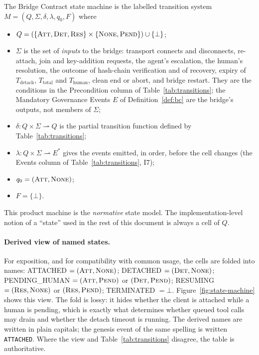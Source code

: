 \begin{definition}\label{def:sm}
The Bridge Contract state machine is the labelled transition system
$M = (Q, \Sigma, \delta, \lambda, q_0, F)$ where
\begin{itemize}[leftmargin=2em]
\item $Q = (\{\textsc{Att}, \textsc{Det}, \textsc{Res}\} \times
\{\textsc{None}, \textsc{Pend}\}) \cup \{\bot\}$;
\item $\Sigma$ is the set of \emph{inputs} to the bridge: transport
connects and disconnects, re-attach, join and key-addition requests, the
agent's escalation, the human's resolution, the outcome of hash-chain
verification and of recovery, expiry of $T_{\text{detach}}$,
$T_{\text{total}}$ and $T_{\text{human}}$, clean end or abort, and bridge
restart. They are the conditions in the Precondition column of
Table~\ref{tab:transitions}; the Mandatory Governance Events $E$ of
Definition~\ref{def:bc} are the bridge's outputs, not members of $\Sigma$;
\item $\delta : Q \times \Sigma \rightharpoonup Q$ is the partial
transition function defined by Table~\ref{tab:transitions};
\item $\lambda : Q \times \Sigma \rightharpoonup E^{*}$ gives the events
emitted, in order, before the cell changes (the Events column of
Table~\ref{tab:transitions}, I7);
\item $q_0 = (\textsc{Att}, \textsc{None})$;
\item $F = \{\bot\}$.
\end{itemize}
This product machine is the \emph{normative} state model. The
implementation-level notion of a ``state'' used in the rest of this
document is always a cell of $Q$.
\end{definition}

\paragraph{Derived view of named states.} For exposition, and for
compatibility with common usage, the cells are folded into
names: ATTACHED $=(\textsc{Att},\textsc{None})$; DETACHED
$=(\textsc{Det},\textsc{None})$; PENDING\_HUMAN $=(\textsc{Att},
\textsc{Pend})$ or $(\textsc{Det},\textsc{Pend})$; RESUMING
$=(\textsc{Res},\textsc{None})$ or $(\textsc{Res},\textsc{Pend})$;
TERMINATED $=\bot$. Figure~\ref{fig:state-machine} shows this view. The
fold is lossy: it hides whether the client is attached while a human is
pending, which is exactly what determines whether queued tool calls may
drain and whether the detach timeout is running. The derived names are
written in plain capitals; the genesis event of the same spelling is
written \texttt{ATTACHED}. Where the view and
Table~\ref{tab:transitions} disagree, the table is authoritative.

